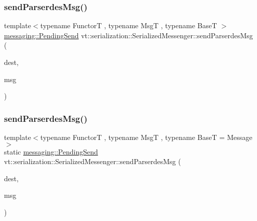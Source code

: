 \mbox{\label{structvt_1_1serialization_1_1_serialized_messenger_afbc39a41f677f4f9dcb32298de023295}} 
\subsubsection{\texorpdfstring{send\+Parserdes\+Msg()}{sendParserdesMsg()}\hspace{0.1cm}{\footnotesize\ttfamily [1/2]}}
{\footnotesize\ttfamily template$<$typename FunctorT , typename MsgT , typename BaseT $>$ \\
\hyperlink{structvt_1_1messaging_1_1_pending_send}{messaging\+::\+Pending\+Send} vt\+::serialization\+::\+Serialized\+Messenger\+::send\+Parserdes\+Msg (\begin{DoxyParamCaption}\item[{\hyperlink{namespacevt_a866da9d0efc19c0a1ce79e9e492f47e2}{Node\+Type}}]{dest,  }\item[{MsgT $\ast$}]{msg }\end{DoxyParamCaption})\hspace{0.3cm}{\ttfamily [static]}}

\mbox{\label{structvt_1_1serialization_1_1_serialized_messenger_afd18647e13a41563cb283341cfd68dd8}} 
\subsubsection{\texorpdfstring{send\+Parserdes\+Msg()}{sendParserdesMsg()}\hspace{0.1cm}{\footnotesize\ttfamily [2/2]}}
{\footnotesize\ttfamily template$<$typename FunctorT , typename MsgT , typename BaseT  = Message$>$ \\
static \hyperlink{structvt_1_1messaging_1_1_pending_send}{messaging\+::\+Pending\+Send} vt\+::serialization\+::\+Serialized\+Messenger\+::send\+Parserdes\+Msg (\begin{DoxyParamCaption}\item[{\hyperlink{namespacevt_a866da9d0efc19c0a1ce79e9e492f47e2}{Node\+Type}}]{dest,  }\item[{MsgT $\ast$}]{msg }\end{DoxyParamCaption})\hspace{0.3cm}{\ttfamily [static]}}

